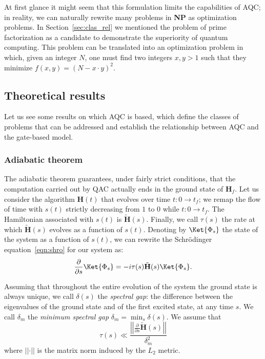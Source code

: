 At first glance it might seem that this formulation limits the capabilities of AQC; in reality, we can naturally rewrite many problems in \textbf{NP} as optimization problems. In Section~\ref{sec:clas_rel} we mentioned the problem of prime factorization as a candidate to demonstrate the superiority of quantum computing. This problem can be translated into an optimization problem in which, given an integer $N$, one must find two integers $x, y > 1$ such that they minimize $f(x,y) = (N - x\cdot y)^2$.
\subsection{Theoretical results}
Let us see some results on which AQC is based, which define the classes of problems that can be addressed and establish the relationship between AQC and the gate-based model.
\subsubsection*{Adiabatic theorem}
The adiabatic theorem guarantees, under fairly strict conditions, that the computation carried out by QAC actually ends in the ground state of $\mathbf{H}_f$. Let us consider the algorithm $\mathbf{H}(t)$ that evolves over time $t:0 \rightarrow t_f$; we remap the flow of time with $s(t)$ strictly decreasing from $1$ to $0$ while $t:0 \rightarrow t_f$. The Hamiltonian associated with $s(t)$ is $\tilde{\mathbf{H}}(s)$. Finally, we call $\tau(s)$ the rate at which $\tilde{\mathbf{H}}(s)$ evolves as a function of $s(t)$. Denoting by $\Ket{\Phi_s}$ the state of the system as a function of $s(t)$, we can rewrite the Schrödinger equation~\ref{eqn:shro} for our system as:
\[
\frac{\partial}{\partial s} \Ket{\Phi_s} =  -i \tau(s)\tilde{\mathbf{H}}(s)\Ket{\Phi_s}.
\]

Assuming that throughout the entire evolution of the system the ground state is always unique, we call $\delta(s)$ the \emph{spectral gap}: the difference between the eigenvalues of the ground state and of the first excited state, at any time $s$. We call $\delta_m$ the \emph{minimum spectral gap} $\delta_m = \min_s \delta(s)$. We assume that
\begin{equation}
	\label{eqn:bound_tau}
	\tau(s) \ll \frac{\left|\left|\frac{\partial}{\partial s} \tilde{\mathbf{H}}(s)\right|\right|}{\delta_m ^2}
\end{equation}
where $\left|\left|\cdot\right|\right|$ is the matrix norm induced by the $L_2$ metric.

